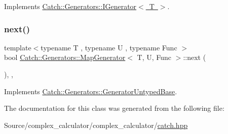 Implements \mbox{\hyperlink{struct_catch_1_1_generators_1_1_i_generator_a525d381fc9249a885b075a0632a8579a}{Catch\+::\+Generators\+::\+I\+Generator$<$ T $>$}}.

\mbox{\label{class_catch_1_1_generators_1_1_map_generator_aa07e2f12d38ae060c30cc30d9dc236c5}} 
\subsubsection{\texorpdfstring{next()}{next()}}
{\footnotesize\ttfamily template$<$typename T , typename U , typename Func $>$ \\
bool \mbox{\hyperlink{class_catch_1_1_generators_1_1_map_generator}{Catch\+::\+Generators\+::\+Map\+Generator}}$<$ T, U, Func $>$\+::next (\begin{DoxyParamCaption}{ }\end{DoxyParamCaption})\hspace{0.3cm}{\ttfamily [inline]}, {\ttfamily [override]}, {\ttfamily [virtual]}}



Implements \mbox{\hyperlink{class_catch_1_1_generators_1_1_generator_untyped_base_aeed3c0cd6233c5f553549e453b8d6638}{Catch\+::\+Generators\+::\+Generator\+Untyped\+Base}}.



The documentation for this class was generated from the following file\+:\begin{DoxyCompactItemize}
\item 
Source/complex\+\_\+calculator/complex\+\_\+calculator/\mbox{\hyperlink{catch_8hpp}{catch.\+hpp}}\end{DoxyCompactItemize}
